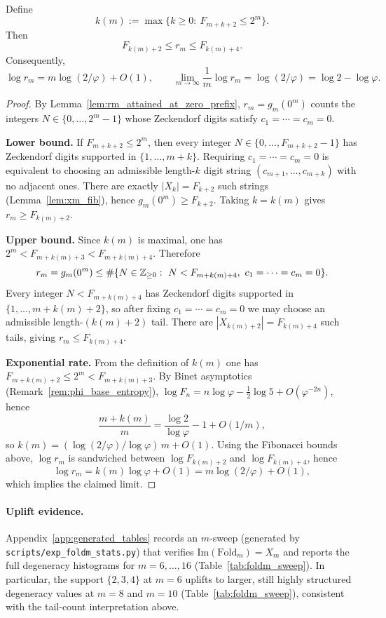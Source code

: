 \begin{proposition}\label{prop:rm_entropy_gap_rate}
\MathTag Define
\[
k(m):=\max\{k\ge 0:\ F_{m+k+2}\le 2^m\}.
\]
Then
\[
F_{k(m)+2}\le r_m\le F_{k(m)+4}.
\]
Consequently,
\[
\log r_m = m\log(2/\varphi)+O(1),
\qquad
\lim_{m\to\infty}\frac{1}{m}\log r_m=\log(2/\varphi)=\log 2-\log\varphi.
\]
\end{proposition}
\begin{proof}
By Lemma~\ref{lem:rm_attained_at_zero_prefix}, $r_m=g_m(0^m)$ counts the integers $N\in\{0,\dots,2^m-1\}$ whose Zeckendorf digits satisfy $c_1=\cdots=c_m=0$.
\par
\noindent\textbf{Lower bound.}
If $F_{m+k+2}\le 2^m$, then every integer $N\in\{0,\dots,F_{m+k+2}-1\}$ has Zeckendorf digits supported in $\{1,\dots,m+k\}$.
Requiring $c_1=\cdots=c_m=0$ is equivalent to choosing an admissible length-$k$ digit string $(c_{m+1},\dots,c_{m+k})$ with no adjacent ones.
There are exactly $|X_k|=F_{k+2}$ such strings (Lemma~\ref{lem:xm_fib}), hence $g_m(0^m)\ge F_{k+2}$.
Taking $k=k(m)$ gives $r_m\ge F_{k(m)+2}$.
\par
\noindent\textbf{Upper bound.}
Since $k(m)$ is maximal, one has $2^m<F_{m+k(m)+3}<F_{m+k(m)+4}$.
Therefore
\[
r_m=g_m(0^m)\le \#\{N\in\mathbb{Z}_{\ge 0}:\ N<F_{m+k(m)+4},\ c_1=\cdots=c_m=0\}.
\]
Every integer $N<F_{m+k(m)+4}$ has Zeckendorf digits supported in $\{1,\dots,m+k(m)+2\}$, so after fixing $c_1=\cdots=c_m=0$ we may choose an admissible length-$(k(m)+2)$ tail.
There are $|X_{k(m)+2}|=F_{k(m)+4}$ such tails, giving $r_m\le F_{k(m)+4}$.
\par
\noindent\textbf{Exponential rate.}
From the definition of $k(m)$ one has
$F_{m+k(m)+2}\le 2^m< F_{m+k(m)+3}$.
By Binet asymptotics (Remark~\ref{rem:phi_base_entropy}), $\log F_n = n\log\varphi-\frac12\log 5+O(\varphi^{-2n})$, hence
\[
\frac{m+k(m)}{m}=\frac{\log 2}{\log\varphi}-1+O(1/m),
\]
so $k(m)=(\log(2/\varphi)/\log\varphi)\,m+O(1)$.
Using the Fibonacci bounds above, $\log r_m$ is sandwiched between $\log F_{k(m)+2}$ and $\log F_{k(m)+4}$, hence
\[
\log r_m = k(m)\log\varphi+O(1)=m\log(2/\varphi)+O(1),
\]
which implies the claimed limit.
\end{proof}

\paragraph{Uplift evidence.}
Appendix~\ref{app:generated_tables} records an $m$-sweep (generated by \texttt{scripts/exp\_foldm\_stats.py}) that verifies $\mathrm{Im}(\mathrm{Fold}_m)=X_m$ and reports the full degeneracy histograms for $m=6,\dots,16$ (Table~\ref{tab:foldm_sweep}).
In particular, the support $\{2,3,4\}$ at $m=6$ uplifts to larger, still highly structured degeneracy values at $m=8$ and $m=10$ (Table~\ref{tab:foldm_sweep}), consistent with the tail-count interpretation above.



